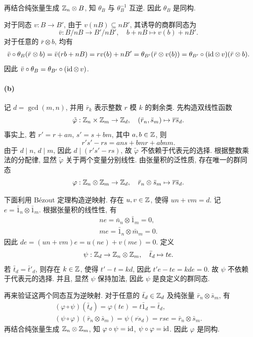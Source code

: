 \documentclass{article}
\begin{document}
\begin{solution}
	再结合纯张量生成 $\mathbb{Z}_n \otimes B$, 知 $\theta_B$ 与 $\theta_B^{-1}$ 互逆. 因此 $\theta_B$ 是同构.

	对于同态 $v: B \to B'$, 由于 $v(nB) \subseteq nB'$, 其诱导的商群同态为
	\[ \bar{v}: B / nB \to B' / nB', \quad b + nB \mapsto v(b) + nB'. \]
	对于任意的 $\bar{r} \otimes b$, 均有
	\begin{align*}
		\bar{v} \circ \theta_B (\bar{r} \otimes b) = \bar{v} (rb + nB) = r v(b) + nB' = \theta_{B'} (\bar{r} \otimes v(b)) = \theta_{B'} \circ (\operatorname{id} \otimes\, v) (\bar{r} \otimes b).
	\end{align*}
	因此 $\bar{v} \circ \theta_B = \theta_{B'} \circ (\operatorname{id} \otimes\, v)$.

	\paragraph{(b)} 记 $d = \gcd(m, n)$, 并用 $\bar{r}_k$ 表示整数 $r$ 模 $k$ 的剩余类. 先构造双线性函数
	\[ \tilde{\varphi}: \mathbb{Z}_n \times \mathbb{Z}_m \to \mathbb{Z}_d, \quad (\bar{r}_n, \bar{s}_m) \mapsto \overline{rs}_d. \]
	事实上, 若 $r' = r + an$, $s' = s + bm$, 其中 $a, b \in \mathbb{Z}$, 则
	\[ r's' - rs = ans + bmr + abnm. \]
	由于 $d \mid n$, $d \mid m$, 因此 $d \mid (r's' - rs)$, 故 $\tilde{\varphi}$ 不依赖于代表元的选择. 根据整数乘法的分配律, 显然 $\tilde{\varphi}$ 关于两个变量分别线性. 由张量积的泛性质, 存在唯一的群同态
	\[ \varphi: \mathbb{Z}_n \otimes \mathbb{Z}_m \to \mathbb{Z}_d, \quad \bar{r}_n \otimes \bar{s}_m \mapsto \overline{rs}_d. \]

	下面利用 Bézout 定理构造逆映射. 存在 $u, v \in \mathbb{Z}$, 使得 $un + vm = d$. 记 $e = \bar{1}_n \otimes \bar{1}_m$. 根据张量积的线性性, 有
	\begin{gather*}
		n e = \bar{n}_n \otimes \bar{1}_m = 0, \\
		m e = \bar{1}_n \otimes \bar{m}_m = 0.
	\end{gather*}
	因此 $de = (un + vm)e = u(ne) + v(me) = 0$. 定义
	\[ \psi: \mathbb{Z}_d \to \mathbb{Z}_n \otimes \mathbb{Z}_m, \quad \bar{t}_d \mapsto te. \]
	若 $\bar{t}_d = \bar{t}'_d$, 则存在 $k \in \mathbb{Z}$, 使得 $t' - t = kd$, 因此 $t'e - te = kde = 0$. 故 $\psi$ 不依赖于代表元的选择. 并且, 显然 $\psi$ 保持加法, 因此 $\psi$ 是良定义的群同态.

	再来验证这两个同态互为逆映射. 对于任意的 $\bar{t}_d \in \mathbb{Z}_d$ 及纯张量 $\bar{r}_n \otimes \bar{s}_m$, 有
	\begin{gather*}
		(\varphi \circ \psi)(\bar{t}_d) = \varphi(te) = t\bar{1}_d = \bar{t}_d, \\
		(\psi \circ \varphi)(\bar{r}_n \otimes \bar{s}_m)
		= \psi(\overline{rs}_d) = rs e = \bar{r}_n \otimes \bar{s}_m.
	\end{gather*}
	再结合纯张量生成 $\mathbb{Z}_n \otimes \mathbb{Z}_m$, 知 $\varphi \circ \psi = \operatorname{id}$, $\psi \circ \varphi = \operatorname{id}$. 因此 $\varphi$ 是同构.


\end{solution}
\end{document}
